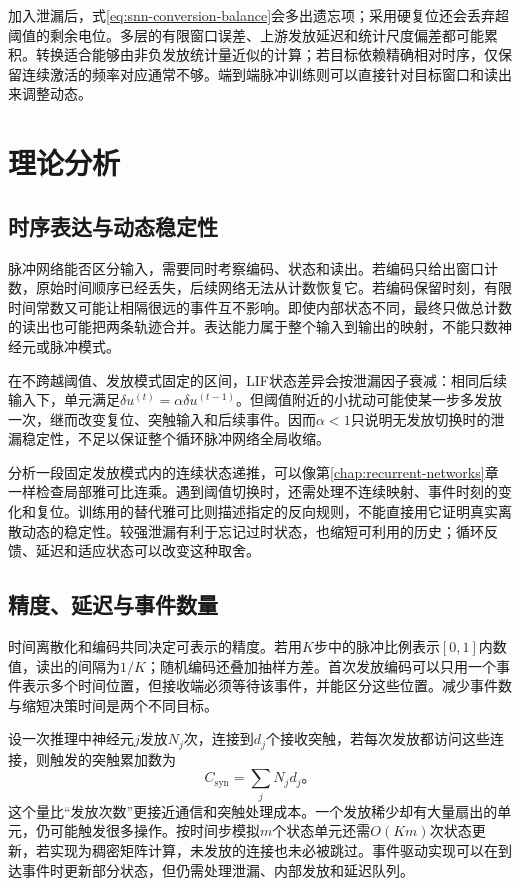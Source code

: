 加入泄漏后，式\eqref{eq:snn-conversion-balance}会多出遗忘项；采用硬复位还会丢弃超阈值的剩余电位。多层的有限窗口误差、上游发放延迟和统计尺度偏差都可能累积。转换适合能够由非负发放统计量近似的计算；若目标依赖精确相对时序，仅保留连续激活的频率对应通常不够。端到端脉冲训练则可以直接针对目标窗口和读出来调整动态。

\section{理论分析}
\label{sec:snn-analysis}

\subsection{时序表达与动态稳定性}
\label{sec:snn-temporal-stability}

脉冲网络能否区分输入，需要同时考察编码、状态和读出。若编码只给出窗口计数，原始时间顺序已经丢失，后续网络无法从计数恢复它。若编码保留时刻，有限时间常数又可能让相隔很远的事件互不影响。即使内部状态不同，最终只做总计数的读出也可能把两条轨迹合并。表达能力属于整个输入到输出的映射，不能只数神经元或脉冲模式。

在不跨越阈值、发放模式固定的区间，LIF状态差异会按泄漏因子衰减：相同后续输入下，单元满足$\delta u^{(t)}=\alpha\delta u^{(t-1)}$。但阈值附近的小扰动可能使某一步多发放一次，继而改变复位、突触输入和后续事件。因而$\alpha<1$只说明无发放切换时的泄漏稳定性，不足以保证整个循环脉冲网络全局收缩。

分析一段固定发放模式内的连续状态递推，可以像第\ref{chap:recurrent-networks}章一样检查局部雅可比连乘。遇到阈值切换时，还需处理不连续映射、事件时刻的变化和复位。训练用的替代雅可比则描述指定的反向规则，不能直接用它证明真实离散动态的稳定性。较强泄漏有利于忘记过时状态，也缩短可利用的历史；循环反馈、延迟和适应状态可以改变这种取舍。

\subsection{精度、延迟与事件数量}
\label{sec:snn-cost}

时间离散化和编码共同决定可表示的精度。若用$K$步中的脉冲比例表示$[0,1]$内数值，读出的间隔为$1/K$；随机编码还叠加抽样方差。首次发放编码可以只用一个事件表示多个时间位置，但接收端必须等待该事件，并能区分这些位置。减少事件数与缩短决策时间是两个不同目标。

设一次推理中神经元$j$发放$N_j$次，连接到$d_j$个接收突触，若每次发放都访问这些连接，则触发的突触累加数为
\begin{equation}
  C_{\mathrm{syn}}=\sum_jN_jd_j\text{。}
  \label{eq:snn-event-cost}
\end{equation}
这个量比“发放次数”更接近通信和突触处理成本。一个发放稀少却有大量扇出的单元，仍可能触发很多操作。按时间步模拟$m$个状态单元还需$O(Km)$次状态更新，若实现为稠密矩阵计算，未发放的连接也未必被跳过。事件驱动实现可以在到达事件时更新部分状态，但仍需处理泄漏、内部发放和延迟队列。

